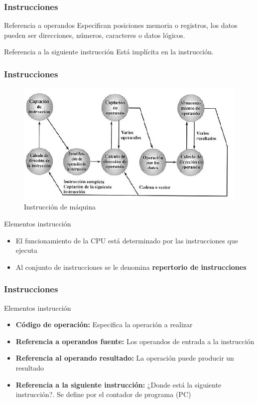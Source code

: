 \documentclass{beamer}
\begin{document}
\begin{frame}
	\frametitle{Instrucciones}
	\begin{block}{Referencia a operandos}
	Especifican posiciones memoria o registros, los datos pueden ser direcciones, números, caracteres o datos lógicos.
	\end{block}	
	\begin{block}{Referencia a la siguiente instrucción}
	Está implícita en la instrucción.
	\end{block}		 		
\end{frame}

\begin{frame}
	\frametitle{Instrucciones}
	\begin{figure}[H]
	\centering
	\includegraphics[scale=0.35]{imagenes/instruccionmaquina.jpg}
	\caption{Instrucción de máquina}
	\end{figure}
	
	\begin{block}{Elementos instrucción}
	\begin{itemize}
		\item El funcionamiento de la CPU está determinado por las instrucciones que ejecuta
		\item Al conjunto de instrucciones se le denomina \textbf{repertorio de instrucciones}
	\end{itemize}
	\end{block}		 		
\end{frame}

\begin{frame}
	\frametitle{Instrucciones}
	\begin{block}{Elementos instrucción}
	\begin{itemize}
		\item \textbf{Código de operación:} Especifica la operación a realizar
		\item \textbf{Referencia a operandos fuente:} Los operandos de entrada a la instrucción
		\item \textbf{Referencia al operando resultado:} La operación puede producir un resultado
		\item \textbf{Referencia a la siguiente instrucción:} ¿Donde está la siguiente instrucción?. Se define por el contador de programa (PC)
	\end{itemize}
	\end{block}		 		
\end{frame}
\end{document}
